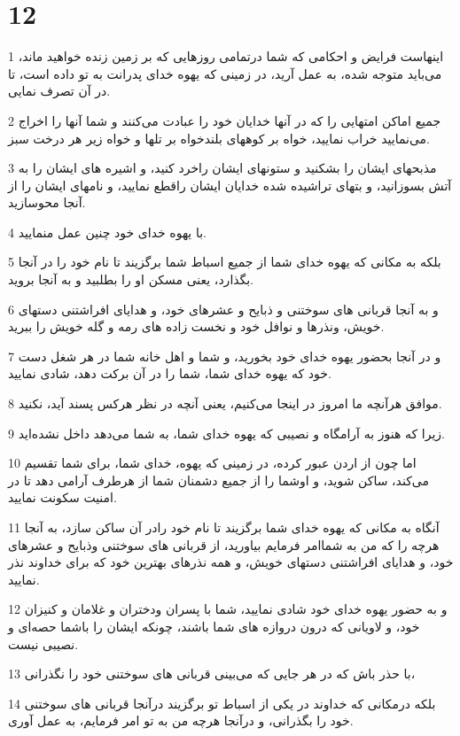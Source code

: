 \chapter{12}

\par 1 اینهاست فرایض و احکامی که شما درتمامی روزهایی که بر زمین زنده خواهید ماند، می‌باید متوجه شده، به عمل آرید، در زمینی که یهوه خدای پدرانت به تو داده است، تا در آن تصرف نمایی.
\par 2 جمیع اماکن امتهایی را که در آنها خدایان خود را عبادت می‌کنند و شما آنها را اخراج می‌نمایید خراب نمایید، خواه بر کوههای بلندخواه بر تلها و خواه زیر هر درخت سبز.
\par 3 مذبحهای ایشان را بشکنید و ستونهای ایشان راخرد کنید، و اشیره های ایشان را به آتش بسوزانید، و بتهای تراشیده شده خدایان ایشان راقطع نمایید، و نامهای ایشان را از آنجا محوسازید.
\par 4 با یهوه خدای خود چنین عمل منمایید.
\par 5 بلکه به مکانی که یهوه خدای شما از جمیع اسباط شما برگزیند تا نام خود را در آنجا بگذارد، یعنی مسکن او را بطلبید و به آنجا بروید.
\par 6 و به آنجا قربانی های سوختنی و ذبایح و عشرهای خود، و هدایای افراشتنی دستهای خویش، ونذرها و نوافل خود و نخست زاده های رمه و گله خویش را ببرید.
\par 7 و در آنجا بحضور یهوه خدای خود بخورید، و شما و اهل خانه شما در هر شغل دست خود که یهوه خدای شما، شما را در آن برکت دهد، شادی نمایید.
\par 8 موافق هرآنچه ما امروز در اینجا می‌کنیم، یعنی آنچه در نظر هرکس پسند آید، نکنید.
\par 9 زیرا که هنوز به آرامگاه و نصیبی که یهوه خدای شما، به شما می‌دهد داخل نشده‌اید.
\par 10 اما چون از اردن عبور کرده، در زمینی که یهوه، خدای شما، برای شما تقسیم می‌کند، ساکن شوید، و اوشما را از جمیع دشمنان شما از هرطرف آرامی دهد تا در امنیت سکونت نمایید.
\par 11 آنگاه به مکانی که یهوه خدای شما برگزیند تا نام خود رادر آن ساکن سازد، به آنجا هرچه را که من به شماامر فرمایم بیاورید، از قربانی های سوختنی وذبایح و عشرهای خود، و هدایای افراشتنی دستهای خویش، و همه نذرهای بهترین خود که برای خداوند نذر نمایید.
\par 12 و به حضور یهوه خدای خود شادی نمایید، شما با پسران ودختران و غلامان و کنیزان خود، و لاویانی که درون دروازه های شما باشند، چونکه ایشان را باشما حصه‌ای و نصیبی نیست.
\par 13 با حذر باش که در هر جایی که می‌بینی قربانی های سوختنی خود را نگذرانی،
\par 14 بلکه درمکانی که خداوند در یکی از اسباط تو برگزیند درآنجا قربانی های سوختنی خود را بگذرانی، و درآنجا هرچه من به تو امر فرمایم، به عمل آوری.
